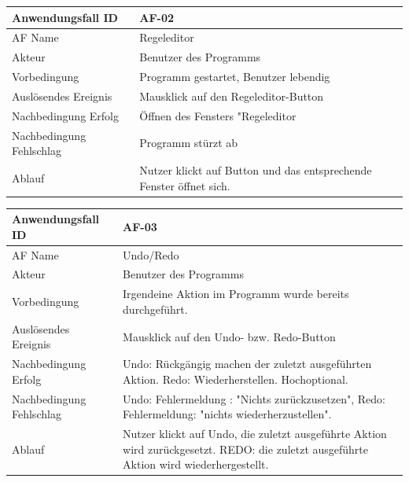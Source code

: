 \documentclass[11pt,a4paper]{article}
\begin{document}
\begin{tabular}[m]{|m{7cm}|m{9cm}|}
    \hline
    Anwendungsfall ID     & AF-02 \\
         \hline
    AF Name     &  Regeleditor \\
         \hline
    Akteur&Benutzer des Programms \\
    \hline
    Vorbedingung&Programm gestartet, Benutzer lebendig\\
    \hline
    Auslösendes Ereignis&Mausklick auf den Regeleditor-Button\\
    \hline
    Nachbedingung Erfolg&Öffnen des Fensters "Regeleditor\\
    \hline
    Nachbedingung Fehlschlag&Programm stürzt ab\\
    \hline
    Ablauf&Nutzer klickt auf Button und das entsprechende Fenster öffnet sich.\\
    \hline
\end{tabular}
\par


\begin{tabular}[m]{|m{7cm}|m{9cm}|}
    \hline
    Anwendungsfall ID     & AF-03  \\
         \hline
    AF Name     &  Undo/Redo \\
         \hline
    Akteur&Benutzer des Programms \\
    \hline
    Vorbedingung&Irgendeine Aktion im Programm wurde bereits durchgeführt.\\
    \hline
    Auslösendes Ereignis&Mausklick auf den Undo- bzw. Redo-Button\\
    \hline
    Nachbedingung Erfolg&Undo: Rückgängig machen der zuletzt ausgeführten Aktion. Redo: Wiederherstellen. Hochoptional.\\
    \hline
    Nachbedingung Fehlschlag&Undo: Fehlermeldung : "Nichts zurückzusetzen", Redo: Fehlermeldung: "nichts wiederherzustellen".\\
    \hline
    Ablauf&Nutzer klickt auf Undo, die zuletzt ausgeführte Aktion wird zurückgesetzt. REDO: die zuletzt ausgeführte Aktion wird wiederhergestellt.\\
    \hline
\end{tabular}
\par
\end{document}
